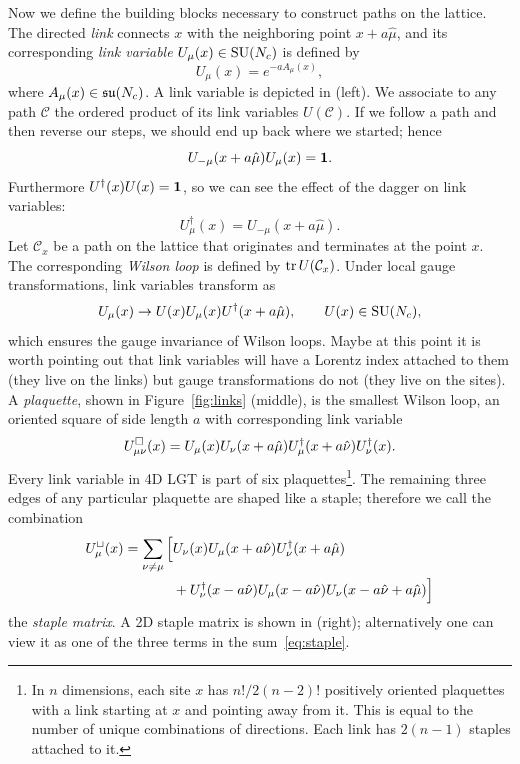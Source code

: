 Now we define the building blocks necessary to construct paths on the 
lattice. The directed {\it link} connects $x$ with the 
neighboring point $x+a\hat{\mu}$, and its corresponding {\it link variable} 
$U_\mu(x)\in \operatorname{SU}(N_c)$ is defined by
\begin{equation}\label{eq:linkVariable}
  U_\mu(x)=e^{-aA_{\mu}(x)},
\end{equation}
where $A_{\mu}(x)\in\operatorname{\mathfrak{su}}(N_c)$. A link variable is
depicted in  (left).
We associate to any path $\mathcal{C}$ 
the ordered product of its link variables $U(\mathcal{C})$. 
If we follow a path and then reverse our steps, we should end
up back where we started; hence
\begin{equation}
  U_{-\mu}(x+a\hat{\mu})U_\mu(x)={\mathbf 1}.
\end{equation}
Furthermore $U^\dagger(x)U(x)={\mathbf 1}$, so we can see the effect
of the dagger on link variables:
\begin{equation}
  U_\mu^\dagger(x)=U_{-\mu}(x+a\hat{\mu}).
\end{equation}
Let $\mathcal{C}_{x}$ be a path on the lattice that originates and 
terminates at the point $x$. The corresponding {\it Wilson loop} is 
defined by $\tr U(\mathcal{C}_{x})$. 
Under local gauge transformations, link variables 
transform as
\begin{equation}
  U_\mu(x)\to U(x)U_\mu(x)U^{\dagger}(x+a\hat{\mu}),\qquad
  U(x)\in\operatorname{SU}(N_c),
\end{equation}
which ensures the gauge invariance of Wilson loops.
Maybe at this point it is worth pointing out that link variables will
have a Lorentz index attached to them (they live on the links) but
gauge transformations do not (they live on the sites). A 
{\it plaquette}, shown in Figure~\ref{fig:links} (middle), is the 
smallest Wilson loop, an oriented square of side length $a$ with 
corresponding link variable 
\begin{equation}
  U^\square_{\mu\nu}(x)=U_\mu(x)U_\nu(x+a\hat{\mu})
                        U^\dagger_\mu(x+a\hat{\nu})U^\dagger_\nu(x).
\end{equation}
Every link variable in 4D LGT is part of six plaquettes\footnote{In $n$
dimensions, each site $x$ has $n!/2(n-2)!$ positively oriented plaquettes 
with a link starting at $x$ and pointing away from it. This is equal to the
number of unique combinations of directions. Each link has $2(n-1)$ staples
attached to it.}. The remaining
three edges of any particular plaquette are shaped like
a staple; therefore we call the combination
\begin{equation}\begin{aligned}\label{eq:staple}\index{staple}
  U^\sqcup_\mu(x)=
  \sum_{\nu\ne\mu}\Big[
   &U_\nu(x)U_\mu(x+a\hat{\nu})U^\dagger_\nu(x+a\hat{\mu})\\
   &+U^\dagger_\nu(x-a\hat{\nu})U_\mu(x-a\hat{\nu})
                   U_\nu(x-a\hat{\nu}+a\hat{\mu})\Big]
\end{aligned}\end{equation}
the {\it staple matrix}. A 2D staple matrix is shown in
 (right); alternatively one can view it
as one of the three terms in the sum~\eqref{eq:staple}.

